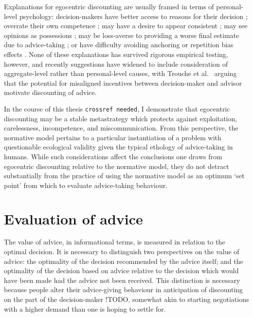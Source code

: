 \documentclass[a4paper, nobind]{templates/ociamthesis}
\begin{document}
Explanations for egocentric discounting are usually framed in terms of personal-level psychology: decision-makers have better access to reasons for their decision \autocite{yanivAdviceTakingDecision2000}; overrate their own competence \autocite{sniezekImprovingJudgementPrepaid2004}; may have a desire to appear consistent \autocite{yanivUsingAdviceMultiple2007}; may see opinions as possessions \autocite{sollJudgmentalAggregationStrategies2011}; may be loss-averse to providing a worse final estimate due to advice-taking \autocite{sollJudgmentalAggregationStrategies2011}; or have difficulty avoiding anchoring \autocite{schultzeInabilityIgnoreUseless2017} or repetition bias effects \autocite{troucheVigilantConservatismEvaluating2018}. None of these explanations has survived rigorous empirical testing, however, and recently suggestions have widened to include consideration of aggregate-level rather than personal-level causes, with Trouche et al.~\autocite*{troucheVigilantConservatismEvaluating2018} arguing that the potential for misaligned incentives between decision-maker and advisor motivate discounting of advice.

In the course of this thesis \texttt{crossref\ needed}, I demonstrate that egocentric discounting may be a stable metastrategy which protects against exploitation, carelessness, incompetence, and miscommunication. From this perspective, the normative model pertains to a particular instantiation of a problem with questionable ecological validity given the typical ethology of advice-taking in humans. While such considerations affect the conclusions one draws from egocentric discounting relative to the normative model, they do not detract substantially from the practice of using the normative model as an optimum `set point' from which to evaluate advice-taking behaviour.

\hypertarget{evaluation-of-advice}{%
\section*{Evaluation of advice}\label{evaluation-of-advice}}

The value of advice, in informational terms, is measured in relation to the optimal decision. It is necessary to distinguish two perspectives on the value of advice: the optimality of the decision recommended by the advice itself; and the optimality of the decision based on advice relative to the decision which would have been made had the advice not been received. This distinction is necessary because people alter their advice-giving behaviour in anticipation of discounting on the part of the decision-maker \autocites{CITATIONNEEDED}[for a case in human-machine teaming see][]{azariaStrategicAdviceProvision2016}!TODO, somewhat akin to starting negotiations with a higher demand than one is hoping to settle for.
\end{document}
